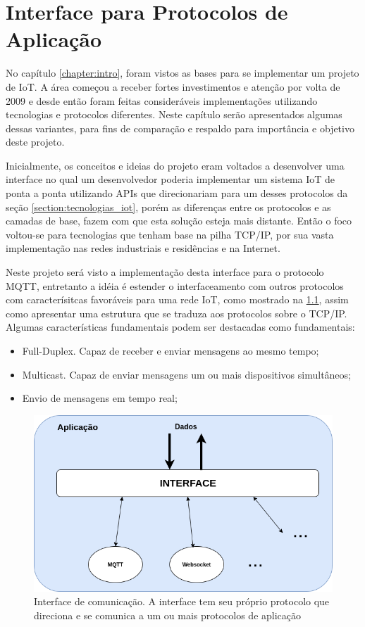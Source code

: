 \chapter{Interface para Protocolos de Aplicação}
\label{chapter:interface_iot}

No capítulo \ref{chapter:intro}, foram vistos as bases para se implementar um projeto de IoT. A área começou a receber fortes investimentos e atenção por volta de 2009 e desde então foram feitas consideráveis implementações utilizando tecnologias e protocolos diferentes. Neste capítulo serão apresentados algumas dessas variantes, para fins de comparação e respaldo para importância e objetivo deste projeto.

Inicialmente, os conceitos e ideias do projeto eram voltados a desenvolver uma interface no qual um desenvolvedor poderia implementar um sistema IoT de ponta a ponta utilizando APIs que direcionariam para um desses protocolos da seção \ref{section:tecnologias_iot}, porém as diferenças entre os protocolos e as camadas de base, fazem com que esta solução esteja mais distante. Então o foco voltou-se  para tecnologias que tenham base na pilha TCP/IP, por sua vasta implementação nas redes industriais e residências e na Internet.

Neste projeto será visto a implementação desta interface para o protocolo MQTT, entretanto a idéia é estender o interfaceamento com outros protocolos com caracterísitcas favoráveis para uma rede IoT, como mostrado na \ref{fig:2.2.0/camada_abatracao}, assim como apresentar uma estrutura que se traduza aos protocolos sobre o TCP/IP. Algumas características fundamentais podem ser destacadas como fundamentais:

\begin{itemize}

\item Full-Duplex. Capaz de receber e enviar mensagens ao mesmo tempo;
\item Multicast. Capaz de enviar mensagens um ou mais dispositivos simultâneos;
\item Envio de mensagens em tempo real;

\end{itemize}


\begin{figure}[h!]
\centering
\includegraphics[width=12cm]{./02_Capitulos/02_Cap2/figures/camada_abstracao}
\caption{Interface de comunicação. A interface tem seu próprio protocolo que direciona e se comunica a um ou mais protocolos de aplicação}
\label{fig:2.2.0/camada_abatracao}
\end{figure}

